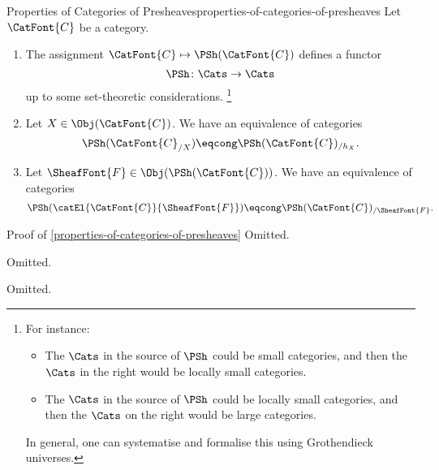 \begin{proposition}{Properties of Categories of Presheaves}{properties-of-categories-of-presheaves}%
    Let $\CatFont{C}$ be a category.
    \begin{enumerate}
        \item\label{properties-of-categories-of-presheaves-functoriality}The assignment $\CatFont{C}\mapsto\PSh(\CatFont{C})$ defines a functor
            \[
                \PSh%
                \colon%
                \Cats%
                \to%
                \Cats%
            \]%
            up to some set-theoretic considerations.%
            \footnote{%
                For instance:
                \begin{itemize}
                    \item The $\Cats$ in the source of $\PSh$ could be small categories, and then the $\Cats$ in the right would be locally small categories.
                    \item The $\Cats$ in the source of $\PSh$ could be locally small categories, and then the $\Cats$ on the right would be large categories.
                \end{itemize}
                In general, one can systematise and formalise this using Grothendieck universes.
                \par\vspace*{-1.75\baselineskip}
            }%
        \item\label{properties-of-categories-of-presheaves-interaction-with-slice-categories}Let $X\in\Obj(\CatFont{C})$. We have an equivalence of categories
            \[
                \PSh(\CatFont{C}_{/X})%
                \eqcong%
                \PSh(\CatFont{C})_{/h_{X}}.%
            \]%
        \item\label{properties-of-categories-of-presheaves-interaction-with-categories-of-elements}Let $\SheafFont{F}\in\Obj(\PSh(\CatFont{C}))$. We have an equivalence of categories
            \[
                \PSh(\catEl{\CatFont{C}}{\SheafFont{F}})%
                \eqcong%
                \PSh(\CatFont{C})_{/\SheafFont{F}}.%
            \]%
    \end{enumerate}
\end{proposition}
\begin{Proof}{Proof of \cref{properties-of-categories-of-presheaves}}%
    Omitted.

    Omitted.

    Omitted.
\end{Proof}
